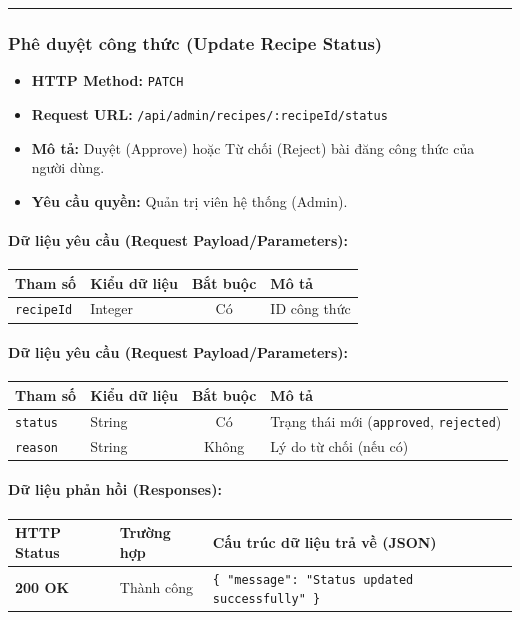 \documentclass[12pt,a4paper]{article}
\begin{document}
\vskip 0.4cm
\noindent\rule{\textwidth}{0.3pt}
\vskip 0.4cm

\subsubsection{Phê duyệt công thức (Update Recipe Status)}
\begin{itemize}[leftmargin=*]
    \item \textbf{HTTP Method:} \texttt{PATCH}
    \item \textbf{Request URL:} \texttt{/api/admin/recipes/:recipeId/status}
    \item \textbf{Mô tả:} Duyệt (Approve) hoặc Từ chối (Reject) bài đăng công thức của người dùng.
    \item \textbf{Yêu cầu quyền:} Quản trị viên hệ thống (Admin).
\end{itemize}

\paragraph{Dữ liệu yêu cầu (Request Payload/Parameters):}
\begin{longtable}{|p{2.8cm}|p{2.2cm}|c|p{7.0cm}|}
\hline
\textbf{Tham số} & \textbf{Kiểu dữ liệu} & \textbf{Bắt buộc} & \textbf{Mô tả} \\ \hline
\endhead
\texttt{recipeId} & Integer & Có & ID công thức \\ \hline
\end{longtable}

\paragraph{Dữ liệu yêu cầu (Request Payload/Parameters):}
\begin{longtable}{|p{2.8cm}|p{2.2cm}|c|p{7.0cm}|}
\hline
\textbf{Tham số} & \textbf{Kiểu dữ liệu} & \textbf{Bắt buộc} & \textbf{Mô tả} \\ \hline
\endhead
\texttt{status} & String & Có & Trạng thái mới (\texttt{approved}, \texttt{rejected}) \\ \hline
\texttt{reason} & String & Không & Lý do từ chối (nếu có) \\ \hline
\end{longtable}

\paragraph{Dữ liệu phản hồi (Responses):}
\begin{longtable}{|p{2.8cm}|p{3.2cm}|p{8.0cm}|}
\hline
\textbf{HTTP Status} & \textbf{Trường hợp} & \textbf{Cấu trúc dữ liệu trả về (JSON)} \\ \hline
\endhead
\textbf{200 OK} & Thành công & \texttt{\{ "message": "Status updated successfully" \}} \\ \hline
\end{longtable}
\end{document}
